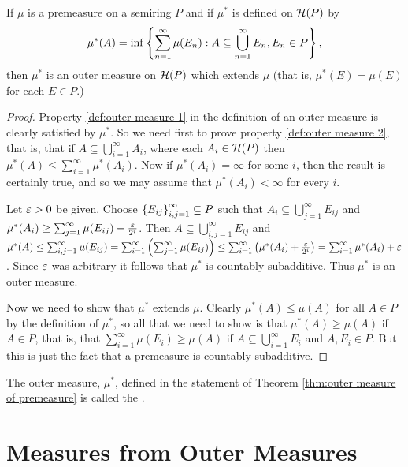 \begin{theorem}\label{thm:outer measure of premeasure}
If $\mu$ is a premeasure on a semiring $P$ and if $\mu^*$ is defined on ${\cal H}(P)$ by \[\mu^*(A)=\inf \left\{\sum_{n=1}^\infty\mu(E_n): A\subseteq\bigcup_{n=1}^\infty E_n, E_n \in P\right\},\] then $\mu^*$ is an outer measure on ${\cal H}(P)$ which extends $\mu$ (that is, $\mu^*(E)=\mu(E)$ for each $E\in P$.)
\end{theorem}

\begin{proof}
Property \ref{def:outer measure 1} in the definition of an outer measure is clearly satisfied by $\mu^*$. So we need first to prove property \ref{def:outer measure 2}, that is, that if $A\subseteq\bigcup_{i=1}^\infty A_i$, where each $A_i\in{\cal H}(P)$ then $\mu^*(A)\leq\sum_{i=1}^\infty \mu^*(A_i)$. Now if $\mu^*(A_i)=\infty$ for some $i$, then the result is certainly true, and so we may assume that $\mu^*(A_i)<\infty$ for every $i$.

Let $\varepsilon>0$ be given. Choose $\left\{E_{ij}\right\}_{i, j=1}^\infty\subseteq P$ such that $A_i\subseteq\bigcup_{j=1}^\infty E_{ij}$ and $\mu^*(A_i)\geq\sum_{j=1}^\infty\mu(E_{ij})-\frac{\varepsilon}{2^i}$. Then $A\subseteq\bigcup_{i,j=1}^\infty E_{i j}$ and $\mu^*(A)\leq\sum_{i,j=1}^\infty\mu(E_{ij})=\sum_{i=1}^\infty\left(\sum_{j=1}^\infty\mu(E_{i j})\right)\leq \sum_{i=1}^\infty\left(\mu^*(A_i)+\frac{\varepsilon}{2^i}\right)\allowbreak=\sum_{i=1}^\infty\mu^*(A_i)+\varepsilon$. Since $\varepsilon$ was arbitrary it follows that $\mu^*$ is countably subadditive. Thus $\mu^*$ is an outer measure.

Now we need to show that $\mu^*$ extends $\mu$. Clearly $\mu^*(A)\leq\mu(A)$ for all $A\in P$ by the definition of $\mu^*$, so all that we need to show is that $\mu^*(A)\geq\mu(A)$ if $A\in P$, that is, that $\sum_{i=1}^\infty\mu(E_i)\geq\mu(A)$ if $A\subseteq \bigcup_{i=1}^\infty E_i$ and $A, E_i \in P$. But this is just the fact that a premeasure is countably subadditive.
\end{proof}

\begin{definition}
The outer measure, $\mu^*$, defined in the statement of Theorem \ref{thm:outer measure of premeasure} is called the .
\end{definition}

\section{Measures from Outer Measures}

